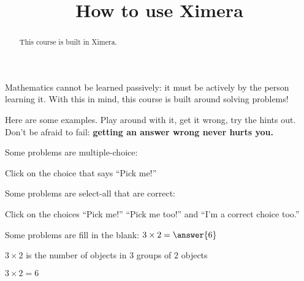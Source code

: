 \documentclass{ximera}
\title{How to use Ximera}
\begin{document}
\begin{abstract}
  This course is built in Ximera.
\end{abstract}\maketitle

Mathematics cannot be learned passively: it must be actively
by the person learning it.  With this in mind, this course is built
around solving problems!

Here are some examples.  Play around with it, get it wrong, try the
hints out.  Don't be afraid to fail: \textbf{getting an answer wrong
  never hurts you.}


\begin{example}
  Some problems are multiple-choice:
  \begin{multipleChoice}
  \end{multipleChoice}
  \begin{feedback}
    Click on the choice that says ``Pick me!''
  \end{feedback}
\end{example}


\begin{example}
  Some problems are select-all that are correct:
  \begin{selectAll}
  \end{selectAll}
  \begin{feedback}
    Click on the choices ``Pick me!'' ``Pick me too!'' and ``I'm a correct choice too.''
  \end{feedback}
\end{example}


\begin{example}
Some problems are fill in the blank: 
  $3\times 2 = \answer{6}$   
  \begin{hint}
    $3 \times 2$ is the number of objects in $3$ groups of $2$ objects
  \end{hint}
  \begin{hint}
    \begin{image}
    \end{image}
  \end{hint}
  \begin{hint}
    $3\times 2=6$
  \end{hint}
\end{example}
\end{document}
